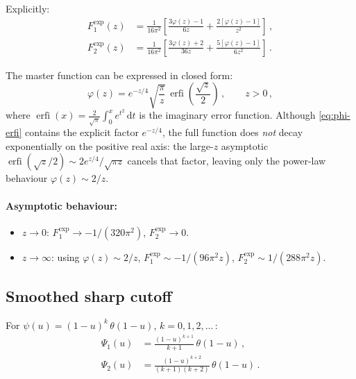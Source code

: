 \documentclass[11pt,a4paper]{article}
\renewcommand{\dd}{\mathrm{d}}
\theoremstyle{definition}
\theoremstyle{remark}
\begin{document}
Explicitly:
\begin{equation}
  \begin{aligned}
  F_1^{\exp}(z) &= \frac{1}{16\pi^2}\left[
  \frac{3\varphi(z)-1}{6z} + \frac{2[\varphi(z)-1]}{z^2}
  \right]\,,\\[4pt]
  F_2^{\exp}(z) &= \frac{1}{16\pi^2}\left[
  \frac{3\varphi(z)+2}{36z} + \frac{5[\varphi(z)-1]}{6z^2}
  \right]\,.
  \end{aligned}
  \label{eq:F-exp-explicit}
\end{equation}

The master function can be expressed in closed form:
\begin{equation}
  \varphi(z) = e^{-z/4}\sqrt{\frac{\pi}{z}}\,\operatorname{erfi}\!\left(\frac{\sqrt{z}}{2}\right)\,,
  \qquad z > 0\,,
  \label{eq:phi-erfi}
\end{equation}
where $\operatorname{erfi}(x) = \frac{2}{\sqrt\pi}\int_0^x e^{t^2}\,\dd t$
is the imaginary error function.  Although \eqref{eq:phi-erfi} contains the
explicit factor $e^{-z/4}$, the full function does \emph{not} decay
exponentially on the positive real axis: the large-$z$ asymptotic
$\operatorname{erfi}(\sqrt{z}/2) \sim 2e^{z/4}/\sqrt{\pi z}$ cancels that
factor, leaving only the power-law behaviour $\varphi(z) \sim 2/z$.

\paragraph{Asymptotic behaviour:}
\begin{itemize}
\item $z \to 0$: $F_1^{\exp} \to -1/(320\pi^2)$,
  $F_2^{\exp} \to 0$.
\item $z \to \infty$: using $\varphi(z) \sim 2/z$,
  $F_1^{\exp} \sim -1/(96\pi^2 z)$,
  $F_2^{\exp} \sim 1/(288\pi^2 z)$.
\end{itemize}


\subsection{Smoothed sharp cutoff}

For $\psi(u) = (1-u)^k\,\theta(1-u)$, $k = 0, 1, 2, \ldots$\,:
\begin{equation}
  \begin{aligned}
  \Psi_1(u) &= \frac{(1-u)^{k+1}}{k+1}\,\theta(1-u)\,,\\[4pt]
  \Psi_2(u) &= \frac{(1-u)^{k+2}}{(k+1)(k+2)}\,\theta(1-u)\,.
  \end{aligned}
  \label{eq:smoothed-cutoff}
\end{equation}
\end{document}

